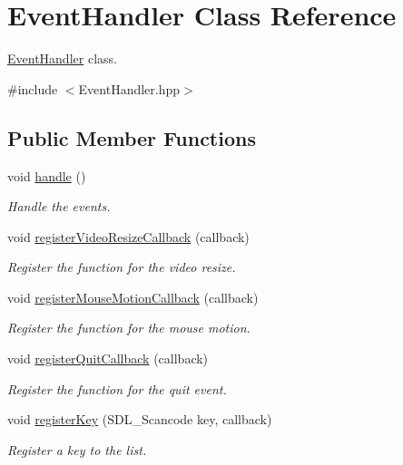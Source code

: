 \hypertarget{classEventHandler}{}\section{Event\+Handler Class Reference}
\label{classEventHandler}


\mbox{\hyperlink{classEventHandler}{Event\+Handler}} class.  




{\ttfamily \#include $<$Event\+Handler.\+hpp$>$}

\subsection*{Public Member Functions}
\begin{DoxyCompactItemize}
\item 
void \mbox{\hyperlink{classEventHandler_a7ac8e1a1cc6661b4738ea521b5d91706}{handle}} ()
\begin{DoxyCompactList}\small\item\em Handle the events. \end{DoxyCompactList}\item 
void \mbox{\hyperlink{classEventHandler_ad456a9c086ff1fe010a428026eddba9c}{register\+Video\+Resize\+Callback}} (callback)
\begin{DoxyCompactList}\small\item\em Register the function for the video resize. \end{DoxyCompactList}\item 
void \mbox{\hyperlink{classEventHandler_a2418d37f4ced90f61e72e84338b069cb}{register\+Mouse\+Motion\+Callback}} (callback)
\begin{DoxyCompactList}\small\item\em Register the function for the mouse motion. \end{DoxyCompactList}\item 
void \mbox{\hyperlink{classEventHandler_abad5fb59e15a41ce6fcb1fed634d0f37}{register\+Quit\+Callback}} (callback)
\begin{DoxyCompactList}\small\item\em Register the function for the quit event. \end{DoxyCompactList}\item 
void \mbox{\hyperlink{classEventHandler_a088e94e8c71afe2165375074e0a27765}{register\+Key}} (S\+D\+L\+\_\+\+Scancode key, callback)
\begin{DoxyCompactList}\small\item\em Register a key to the list. \end{DoxyCompactList}\item 

\end{DoxyCompactItemize}
